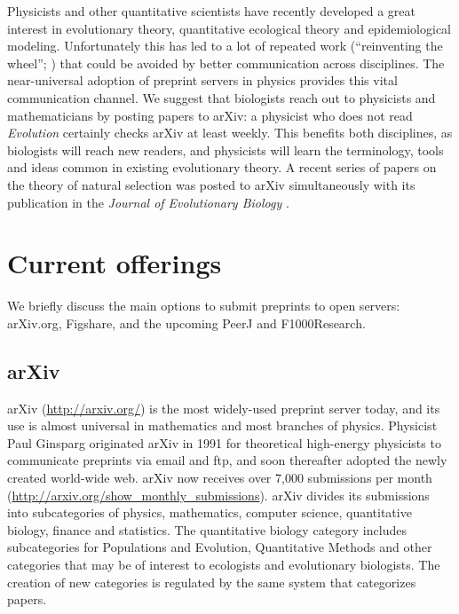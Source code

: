 \documentclass[letterpaper,twocolumn,superscriptaddress,showkeys]{revtex4}
\begin{document}
Physicists and other quantitative scientists have recently developed a
great interest in evolutionary theory, quantitative ecological theory
and epidemiological modeling.  Unfortunately this has led to a lot of
repeated work (``reinventing the wheel''; \cite{de2011contribution})
that could be avoided by better communication across disciplines.  The
near-universal adoption of preprint servers in physics provides this
vital communication channel.  We suggest that biologists reach out to
physicists and mathematicians by posting papers to arXiv: a physicist
who does not read \emph{Evolution} certainly checks arXiv at least
weekly.  This benefits both disciplines, as biologists will reach new
readers, and physicists will learn the terminology, tools and ideas
common in existing evolutionary theory.  A recent series of papers on
the theory of natural selection was posted to arXiv simultaneously
with its publication in the \emph{Journal of Evolutionary Biology}
\cite{JEB:JEB2431,JEB:JEB2498,JEB:JEB2378,JEB:JEB2373}.

\section{Current offerings}

We briefly discuss the main options to submit preprints to open servers:
arXiv.org, Figshare, and the upcoming PeerJ and F1000Research.

\subsection{arXiv}

%

arXiv (\url{http://arxiv.org/}) is the most widely-used preprint
server today, and its use is almost universal in mathematics and most
branches of physics.  Physicist Paul Ginsparg originated arXiv in 1991
for theoretical high-energy physicists to communicate preprints via
email and ftp, and soon thereafter adopted the newly created
world-wide web\cite{jackson2002preprints}.  arXiv now receives over
7,000 submissions per month
(\url{http://arxiv.org/show_monthly_submissions}).  arXiv divides its
submissions into subcategories of physics, mathematics, computer
science, quantitative biology, finance and statistics.  The
quantitative biology category includes subcategories for Populations
and Evolution, Quantitative Methods and other categories that may be
of interest to ecologists and evolutionary biologists.
The creation of new categories is regulated by the same system that
categorizes papers.
\end{document}
